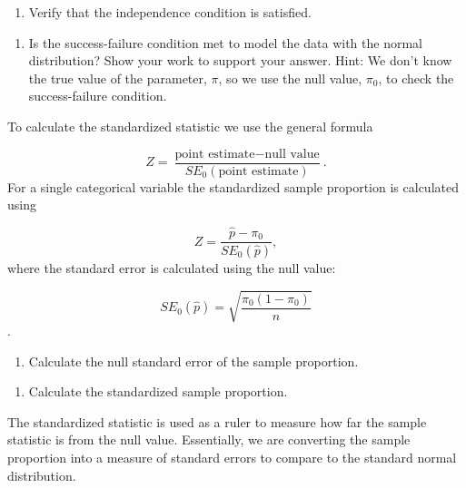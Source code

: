 \documentclass[
]{report}
\providecommand{\tightlist}{%
  \setlength{\itemsep}{0pt}\setlength{\parskip}{0pt}}
\begin{document}
\begin{enumerate}
\def\labelenumi{\arabic{enumi}.}
\setcounter{enumi}{2}
\tightlist
\item
  Verify that the independence condition is satisfied.
\end{enumerate}

\vspace{0.5in}

\begin{enumerate}
\def\labelenumi{\arabic{enumi}.}
\setcounter{enumi}{3}
\tightlist
\item
  Is the success-failure condition met to model the data with the normal distribution? Show your work to support your answer. Hint: We don't know the true value of the parameter, \(\pi\), so we use the null value, \(\pi_0\), to check the success-failure condition.
\end{enumerate}

\vspace{1in}

To calculate the standardized statistic we use the general formula

\[
Z = \frac{\text{point estimate} - \text{null value}}{SE_0(\text{point estimate})}.
\]
For a single categorical variable the standardized sample proportion is calculated using

\[
Z = \frac{\hat{p} - \pi_0}{SE_0(\hat{p})},
\]
where the standard error is calculated using the null value:

\[SE_0(\hat{p})=\sqrt{\frac{\pi_0(1-\pi_0)}{n}}\].
\vspace{0.5mm}

\begin{enumerate}
\def\labelenumi{\arabic{enumi}.}
\setcounter{enumi}{4}
\tightlist
\item
  Calculate the null standard error of the sample proportion.
\end{enumerate}

\vspace{1in}

\begin{enumerate}
\def\labelenumi{\arabic{enumi}.}
\setcounter{enumi}{5}
\tightlist
\item
  Calculate the standardized sample proportion.
\end{enumerate}

\vspace{1in}

The standardized statistic is used as a ruler to measure how far the sample statistic is from the null value. Essentially, we are converting the sample proportion into a measure of standard errors to compare to the standard normal distribution.
\end{document}
